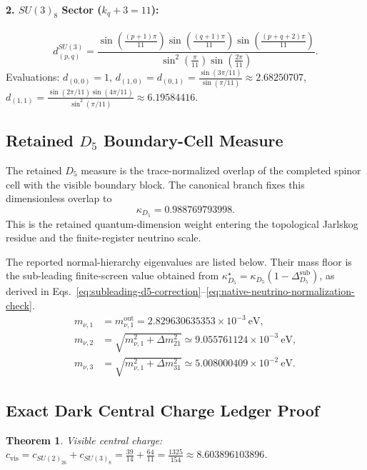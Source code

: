 \documentclass[11pt,letterpaper]{article}
\theoremstyle{plain}
\newtheorem{theorem}{Theorem}
\newcommand{\kappad}{\kappa_{D_5}}
\begin{document}
\paragraph{2. $SU(3)_8$ Sector ($k_q + 3 = 11$):}
\begin{equation}
d_{(p,q)}^{SU(3)} = \frac{\sin\left(\frac{(p+1)\pi}{11}\right) \sin\left(\frac{(q+1)\pi}{11}\right) \sin\left(\frac{(p+q+2)\pi}{11}\right)}{\sin^2\left(\frac{\pi}{11}\right) \sin\left(\frac{2\pi}{11}\right)}.
\end{equation}
Evaluations: $d_{(0,0)} = 1$, $d_{(1,0)} = d_{(0,1)} = \frac{\sin(3\pi/11)}{\sin(\pi/11)} \approx 2.68250707$, $d_{(1,1)} = \frac{\sin(2\pi/11) \sin(4\pi/11)}{\sin^2(\pi/11)} \approx 6.19584416$.

\subsection{Retained \texorpdfstring{$D_5$}{D5} Boundary-Cell Measure}
The retained $D_5$ measure is the trace-normalized overlap of the completed
spinor cell with the visible boundary block.  The canonical branch fixes this
dimensionless overlap to
\begin{equation}
\label{eq:kappa-d5-measure}
 \boxed{
 \kappad
 =0.988769793998.}
\end{equation}
This is the retained quantum-dimension weight entering the topological
Jarlskog residue and the finite-register neutrino scale.

The reported normal-hierarchy eigenvalues are listed below.  Their mass floor
is the sub-leading finite-screen value obtained from
\(\kappad^\star=\kappad(1-\Delta_{D_5}^{\text{sub}})\), as derived in
Eqs.~\eqref{eq:subleading-d5-correction}--\eqref{eq:native-neutrino-normalization-check}.
\begin{align}
\label{eq:supplement-lightest-neutrino}
 m_{\nu,1}
 &=
 m_{\nu,1}^{\text{out}}
 =
 2.829630635353\times10^{-3}\ \mathrm{eV},\\
 m_{\nu,2}
 &=
 \sqrt{m_{\nu,1}^2+\Delta m_{21}^2}
 \simeq
 9.055761124\times10^{-3}\ \mathrm{eV},\nonumber\\
\label{eq:supplement-third-neutrino}
 m_{\nu,3}
 &=
 \sqrt{m_{\nu,1}^2+\Delta m_{31}^2}
 \simeq
 5.008000409\times10^{-2}\ \mathrm{eV}.
\end{align}

\subsection{Exact Dark Central Charge Ledger Proof}
\label{app:coset-anomaly-extractions}
\begin{theorem}
Visible central charge: $c_{\text{vis}} = c_{SU(2)_{26}} + c_{SU(3)_8} = \frac{39}{14} + \frac{64}{11} = \frac{1325}{154} \approx 8.603896103896$.
\end{theorem}
\end{document}
